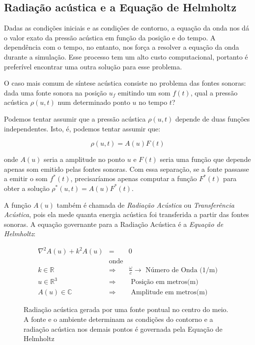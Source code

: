 \subsection{Radiação acústica e a Equação de Helmholtz}

Dadas as condições iniciais e as condições de contorno, a equação da onda nos dá o valor exato da pressão acústica em função da posição e do tempo. A dependência com o tempo, no entanto, nos força a resolver a equação da onda durante a simulação. Esse processo tem um alto custo computacional, portanto é preferível encontrar uma outra solução para esse problema.


O caso mais comum de síntese acústica consiste no problema das fontes sonoras: dada uma fonte sonora na posição $u_f$ emitindo um som $f(t)$, qual a pressão acústica $\rho(u, t)$ num determinado ponto $u$ no tempo $t$?

Podemos tentar assumir que a pressão acústica $\rho(u, t)$ depende de duas funções independentes. Isto, é, podemos tentar assumir que:

\begin{equation}
	\rho(u, t) = A(u)F(t)
\end{equation}

onde $A(u)$ seria a amplitude no ponto $u$ e $F(t)$ seria uma função que depende apenas som emitido pelas fontes sonoras. Com essa separação, se a fonte passasse a emitir o som $f^*(t)$, precisaríamos apenas computar a função $F^*(t)$ para obter a solução $\rho^*(u, t) = A(u)F^*(t)$. 

A função $A(u)$ também é chamada de \emph{Radiação Acústica} ou \emph{Transferência Acústica}, pois ela mede quanta energia acústica foi transferida a partir das fontes sonoras. A equação governante para a Radiação Acústica é a \emph{Equação de Helmholtz}:

\begin{eqnarray}
	\nabla^2 A(u) + k^2A(u) &=& 0\label{helmholtzequation}\\
&\text{onde}&\nonumber\\
k \in \mathbb{R} &\Rightarrow& \frac{\omega}{c}\rightarrow\text{ Número de Onda (1/m)} \nonumber\\
u \in \mathbb{R}^3 &\Rightarrow& \text{ Posição em metros(m)} \nonumber\\
A(u) \in \mathbb{C} &\Rightarrow& \text{ Amplitude em metros(m)} \nonumber
\end{eqnarray}

\begin{figure}[ht]
	\centering
	
	\caption[Radiação acústica gerada uma fonte pontual]{Radiação acústica gerada por uma fonte pontual no centro do meio. A fonte e o ambiente determinam as condições do contorno e a radiação acústica nos demais pontos é governada pela Equação de Helmholtz}\label{helmholtz}
\end{figure}

